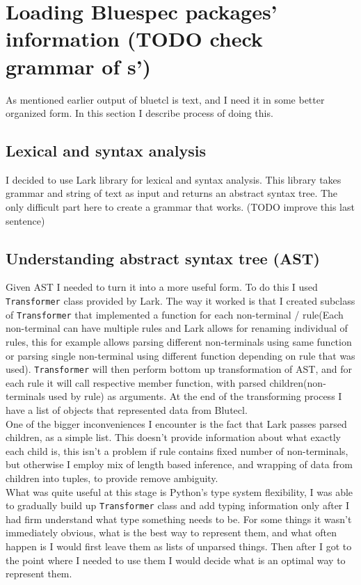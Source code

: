 \documentclass[14pt]{report}
\begin{document}
\section{Loading Bluespec packages' information (TODO check grammar of s')}
As mentioned earlier output of bluetcl is text, and I need it in some better organized form. In this section I describe process of doing this.
\subsection{Lexical and syntax analysis}
I decided to use Lark library for lexical and syntax analysis. This library takes grammar and string of text as input and returns an abstract syntax tree. The only difficult part here to create a grammar that works. (TODO improve this last sentence)

\subsection{Understanding abstract syntax tree (AST)}
Given AST I needed to turn it into a more useful form. To do this I used \verb!Transformer! class provided by Lark. The way it worked is that I created subclass of \verb!Transformer! that implemented a function for each non-terminal / rule(Each non-terminal can have multiple rules and Lark allows for renaming individual of rules, this for example allows parsing different non-terminals using same function or parsing single non-terminal using different function depending on rule that was used). \verb!Transformer! will then perform bottom up transformation of AST, and for each rule it will call respective member function, with parsed children(non-terminals used by rule) as arguments. At the end of the transforming process I have a list of objects that represented data from Blutecl.
\\
One of the bigger inconveniences I encounter is the fact that Lark passes parsed children, as a simple list. This doesn't provide information about what exactly each child is, this isn't a problem if rule contains fixed number of non-terminals, but otherwise I employ mix of length based inference, and wrapping of data from children into tuples, to provide remove ambiguity.
\\
What was quite useful at this stage is Python's type system flexibility, I was able to gradually build up \verb!Transformer! class and add typing information only after I had firm understand what type something needs to be. For some things it wasn't immediately obvious, what is the best way to represent them, and what often happen is I would first leave them as lists of unparsed things. Then after I got to the point where I needed to use them I would decide what is an optimal way to represent them.
\end{document}
